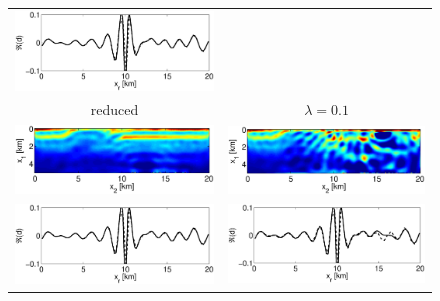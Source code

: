 \documentclass{iopart}
\begin{document}
{\begin{figure}
\begin{tabular}{cc}
\includegraphics[scale=.3]{./figs/2D_overthrust2_m}\\
{\small reduced}&
{\small $\lambda=0.1$}\\
\includegraphics[scale=.3]{./figs/2D_overthrust2_i}&
\includegraphics[scale=.3]{./figs/2D_overthrust2_j}\\
\includegraphics[scale=.3]{./figs/2D_overthrust2_n}&
\includegraphics[scale=.3]{./figs/2D_overthrust2_o}\\

\end{tabular}
\end{figure}}
\end{document}
